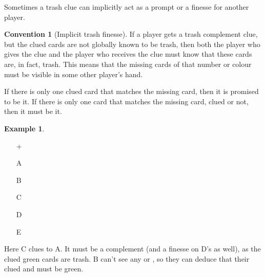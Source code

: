 \documentclass[a4paper]{article}
\theoremstyle{plain}
\theoremstyle{definition}
\newtheorem{example}[theorem]{Example}
\newtheorem{convention}[theorem]{Convention}
\begin{document}
Sometimes a trash clue can implicitly act as a prompt or a finesse for another player.

\begin{convention}[Implicit trash finesse]
	If a player gets a trash complement clue, but the clued cards are not globally known to be trash, then both the player who gives the clue and the player who receives the clue must know that these cards are, in fact, trash. This means that the missing cards of that number or colour must be visible in some other player's hand.
	
	If there is only one clued card that matches the missing card, then it is promised to be it. If there is only one card that matches the missing card, clued or not, then it must be it.
\end{convention}

\begin{example}	\hfill \\
	\begin{minipage}{0.45\textwidth}
		\begin{itemize}
			\item[\Large +]      
			\item[\Large A]    
			\item[\Large B]    
			\item[\Large C]    
			\item[\Large D]    
			\item[\Large E]    
		\end{itemize}
	\end{minipage}%
	\begin{minipage}{0.55\textwidth}
		Here C clues  to A. It must be a complement (and a finesse on D's  as well), as the clued green cards are trash. B can't see any  or , so they can deduce that their clued  and  must be green.
	\end{minipage}
\end{example} \vspace{0.15 cm}
\end{document}
